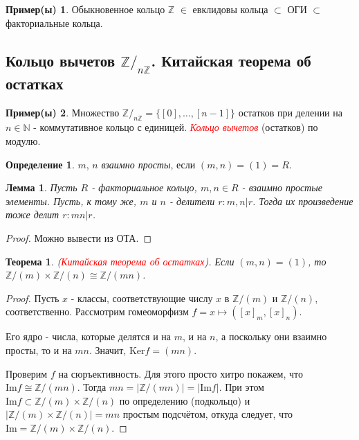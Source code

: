 \documentclass[a4paper,100pt]{article}
\theoremstyle{indented}
\newtheorem{theorem}{Теорема}
\newtheorem{lemma}{Лемма}
\theoremstyle{definition}
\newtheorem{defn}{Определение}
\newtheorem{exl}{Пример(ы)}
\theoremstyle{remark}
\begin{document}
\begin{exl}
    Обыкновенное кольцо $\mathbb{Z}$ $\in$ евклидовы кольца $\subset$ ОГИ $\subset$ факториальные кольца.
\end{exl}

\resetall

\subsection{Кольцо вычетов $\mathbb{Z}/_{n\mathbb{Z}}$. Китайская теорема об остатках}

\begin{exl}
    Множество $\mathbb{Z}/_{n\mathbb{Z}} = \{[0], \dots, [n-1]\}$ остатков при делении на $n\in \mathbb{N}$ - коммутативное кольцо с единицей. \hypertarget{n14}{\textcolor{red}{\textit{Кольцо вычетов}}} (остатков) по модулю.
\end{exl}

\begin{defn}
    $m$, $n$ \textit{взаимно просты}, если $(m,n)=(1)=R$.
\end{defn}

\begin{lemma}
    Пусть $R$ - факториальное кольцо, $m, n\in R$ - взаимно простые элементы. Пусть, к тому же, $m$ и $n$ - делители $r:m,n\vert r$. Тогда их произведение тоже делит $r:mn\vert r$.
\end{lemma}

\begin{proof}
    Можно вывести из ОТА.
\end{proof}

\begin{theorem}
    (\hypertarget{n15}{\textcolor{red}{\textit{Китайская теорема об остатках}}}). Если $(m,n)=(1)$, то $\mathbb{Z}/(m)\times \mathbb{Z}/(n)\cong \mathbb{Z}/(mn)$.
\end{theorem}

\begin{proof}
    Пусть $x$ - классы, соответствующие числу $x$ в $\mathbb{Z}/(m)$ и $\mathbb{Z}/(n)$, соответственно. Рассмотрим гомеоморфизм $f=x\mapsto ([x]_m, [x]_n)$.\ 

    Его ядро - числа, которые делятся и на $m$, и на $n$, а поскольку они взаимно просты, то и на $mn$. Значит, $\text{Ker} f= (mn)$.\ 

    Проверим $f$ на сюръективность. Для этого просто хитро покажем, что $\text{Im} f \cong \mathbb{Z}/(mn)$. Тогда $mn = \vert \mathbb{Z}/(mn)\vert = \vert \text{Im} f\vert$. При этом $\text{Im} f \subset \mathbb{Z}/(m)\times \mathbb{Z}/(n)$ по определению (подкольцо) и $\vert \mathbb{Z}/(m)\times \mathbb{Z}/(n) \vert = mn$ простым подсчётом, откуда следует, что $\text{Im}=\mathbb{Z}/(m)\times \mathbb{Z}/(n)$.
\end{proof}
\end{document}

